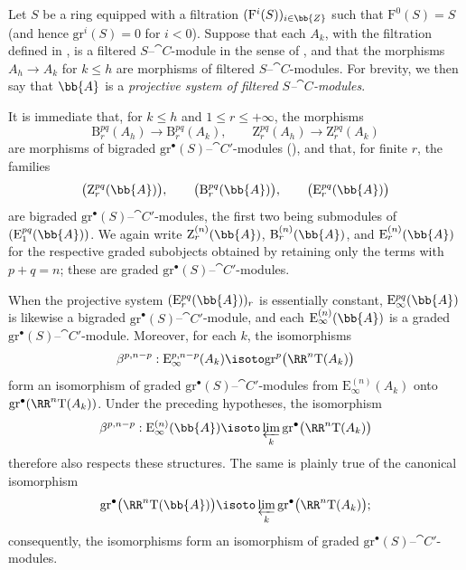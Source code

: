 \begin{env}[13.7.6]
\label{0.13.7.6}
Let $S$ be a ring equipped with a filtration
$(\mathrm{F}^i(S))_{i\in\bb{Z}}$ such that
$\mathrm{F}^0(S)=S$ (and hence
$\mathrm{gr}^i(S)=0$ for $i<0$).
Suppose that each $A_k$, with the filtration defined in
, is a filtered
$S$--$\cat{C}$-module in the sense of , and that the
morphisms $A_h\longrightarrow A_k$ for $k\leq h$ are morphisms of
filtered $S$--$\cat{C}$-modules.
For brevity, we then say that $\bb{A}$ is a
\emph{projective system of filtered $S$--$\cat{C}$-modules}.

It is immediate that, for $k\leq h$ and
$1\leq r\leq+\infty$, the morphisms
\[
  \mathrm{B}_r^{pq}(A_h)\longrightarrow\mathrm{B}_r^{pq}(A_k),
  \qquad
  \mathrm{Z}_r^{pq}(A_h)\longrightarrow\mathrm{Z}_r^{pq}(A_k)
\]
are morphisms of bigraded
$\mathrm{gr}^\bullet(S)$--$\cat{C}'$-modules
(), and that, for finite $r$, the families
\[
  \bigl(\mathrm{Z}_r^{pq}(\bb{A})\bigr),\qquad
  \bigl(\mathrm{B}_r^{pq}(\bb{A})\bigr),\qquad
  \bigl(\mathrm{E}_r^{pq}(\bb{A})\bigr)
\]
are bigraded
$\mathrm{gr}^\bullet(S)$--$\cat{C}'$-modules, the first two being
submodules of $(\mathrm{E}_1^{pq}(\bb{A}))$.
We again write
$\mathrm{Z}_r^{(n)}(\bb{A})$,
$\mathrm{B}_r^{(n)}(\bb{A})$, and
$\mathrm{E}_r^{(n)}(\bb{A})$ for the respective graded subobjects
obtained by retaining only the terms with $p+q=n$; these are graded
$\mathrm{gr}^\bullet(S)$--$\cat{C}'$-modules.

When the projective system
$(\mathrm{E}_r^{pq}(\bb{A}))_r$ is essentially constant,
$\mathrm{E}_\infty^{pq}(\bb{A})$ is likewise a bigraded
$\mathrm{gr}^\bullet(S)$--$\cat{C}'$-module, and each
$\mathrm{E}_\infty^{(n)}(\bb{A})$ is a graded
$\mathrm{gr}^\bullet(S)$--$\cat{C}'$-module.
Moreover, for each $k$, the isomorphisms
\[
  \beta^{p,n-p}:
  \mathrm{E}_\infty^{p,n-p}(A_k)
  \isoto
  \mathrm{gr}^p\bigl(\RR^n\mathrm{T}(A_k)\bigr)
\]
form an isomorphism of graded
$\mathrm{gr}^\bullet(S)$--$\cat{C}'$-modules from
$\mathrm{E}_\infty^{(n)}(A_k)$ onto
$\mathrm{gr}^\bullet(\RR^n\mathrm{T}(A_k))$.
Under the preceding hypotheses, the isomorphism
\[
  \beta^{p,n-p}:
  \mathrm{E}_\infty^{(n)}(\bb{A})
  \isoto
  \varprojlim_k
  \mathrm{gr}^\bullet\bigl(\RR^n\mathrm{T}(A_k)\bigr)
\]
therefore also respects these structures.
The same is plainly true of the canonical isomorphism
\[
  \mathrm{gr}^\bullet\bigl(\RR^n\mathrm{T}(\bb{A})\bigr)
  \isoto
  \varprojlim_k
  \mathrm{gr}^\bullet\bigl(\RR^n\mathrm{T}(A_k)\bigr);
\]
consequently, the isomorphisms  form an
isomorphism of graded
$\mathrm{gr}^\bullet(S)$--$\cat{C}'$-modules.
\end{env}

